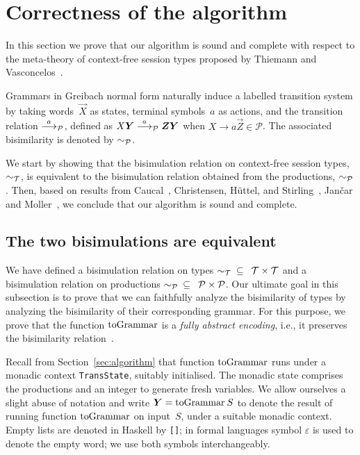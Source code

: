 \section{Correctness of the algorithm}
\label{sec:soundness}

In this section we prove that our algorithm is sound and complete
with respect to the meta-theory of context-free session types proposed
by Thiemann and Vasconcelos~\cite{thiemann2016context}.


Grammars in Greibach normal form naturally induce a labelled
transition system by taking words~$\vec X$ as states, terminal
symbols~$a$ as actions, and the transition relation $\stackrel{a}{\longrightarrow}_\mathcal P$,
defined as $X\vec Y\LTSderivesP \vec Z\vec Y$ when
$X \rightarrow a\vec Z \in \mathcal P$.  The associated bisimilarity
is denoted by $\sim_\mathcal P$.

We start by showing that the bisimulation relation on context-free
session types, $\sim_\mathcal T$, is equivalent to the bisimulation
relation obtained from the productions, $\sim_\mathcal P$.  Then, based on
results from Caucal~\cite{caucal1986decidabilite}, Christensen,
H{\"{u}}ttel, and Stirling~\cite{DBLP:journals/iandc/ChristensenHS95},
Jan{\v{c}}ar and Moller~\cite{janvcar1999techniques}, we conclude that
our algorithm is sound and complete.

\subsection{The two bisimulations are equivalent}

We have defined a bisimulation relation on types 
$\sim_\mathcal T \enspace\subseteq \enspace\mathcal{T} \times \mathcal{T}$
and a bisimulation relation on productions 
$\sim_\mathcal P \enspace\subseteq \enspace\mathcal{P} \times \mathcal{P}$.
Our ultimate goal in this subsection is to prove that we can 
faithfully analyze the bisimilarity of types 
by analyzing the bisimilarity of their corresponding
grammar. For this purpose, we prove that the function $\toGrammark$ 
is a {\it fully abstract encoding}, i.e., it preserves the 
bisimilarity relation~\cite{gorla2016full}.

Recall from Section~\ref{sec:algorithm} that function $\toGrammark$ 
runs under a monadic context
\lstinline|TransState|, suitably initialised.
%
The monadic state comprises the productions and an integer to generate
fresh variables.
%
We allow ourselves a slight abuse of notation and write
$\vec Y = \toGrammarf S$ to denote the result of running function
$\toGrammark$ on input~$S$, under a suitable monadic context.
%
Empty lists are denoted in Haskell by \lstinline|[]|;
in formal languages symbol $\varepsilon$ is used to denote the empty
word; we use both symbols interchangeably.

